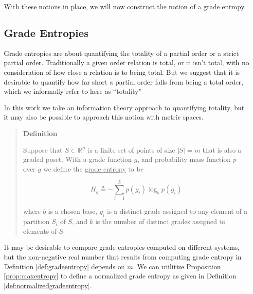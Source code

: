 \documentclass[
  letterpaper,
  DIV=11,
  numbers=noendperiod]{scrreprt}
\begin{document}
With these notions in place, we will now construct the notion of a grade
entropy.

\subsection{Grade Entropies}\label{grade-entropies-1}

Grade entropies are about quantifying the totality of a partial order or
a strict partial order. Traditionally a given order relation is total,
or it isn't total, with no consideration of how close a relation is to
being total. But we suggest that it is desirable to quantify how far
short a partial order falls from being a total order, which we
informally refer to here as ``totality''

\begin{tcolorbox}[enhanced jigsaw, colframe=quarto-callout-note-color-frame, toptitle=1mm, bottomtitle=1mm, breakable, colbacktitle=quarto-callout-note-color!10!white, arc=.35mm, coltitle=black, opacitybacktitle=0.6, opacityback=0, leftrule=.75mm, titlerule=0mm, title=\textcolor{quarto-callout-note-color}{\faInfo}\hspace{0.5em}{Note}, rightrule=.15mm, toprule=.15mm, colback=white, bottomrule=.15mm, left=2mm]

In this work we take an information theory approach to quantifying
totality, but it may also be possible to approach this notion with
metric spaces.

\end{tcolorbox}

\begin{quote}
\textbf{Definition}

Suppose that \(S \subset   \mathbb{R}^n\) is a finite set of points of
size \(|S|=m\) that is also a graded poset. With a grade function \(g\),
and probability mass function \(p\) over \(g\) we define the
\underline{grade entropy} to be

\[H_g \triangleq - \sum_{i=1}^{k} p(g_i)  \log_b  p(g_i) \]

where \(b\) is a chosen base, \(g_i\) is a distinct grade assigned to
any element of a partition \(S_i\) of \(S\), and \(k\) is the number of
distinct grades assigned to elements of \(S\).
\end{quote}

It may be desirable to compare grade entropies computed on different
systems, but the non-negative real number that results from computing
grade entropy in Definition \ref{def:gradeentropy} depends on \(m\). We
can utilitize Proposition \ref{prop:maxentropy} to define a normalized
grade entropy as given in Definition \ref{def:normalizedgradeentropy}.
\end{document}
